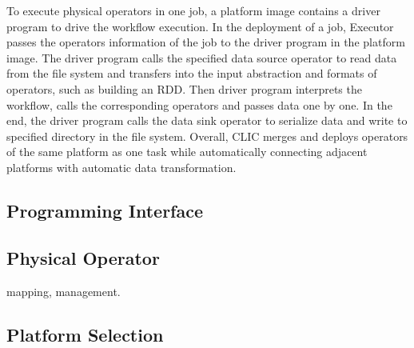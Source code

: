 To execute physical operators in one job, a platform image contains a driver program to drive the workflow execution. 
In the deployment of a job, Executor passes the operators information of the job to the driver program in the platform image. 
The driver program calls the specified data source operator to read data from the file system and transfers into the input abstraction and formats of operators, such as building an RDD. Then driver program interprets the workflow, calls the corresponding operators and passes data one by one. In the end, the driver program calls the data sink operator to serialize data and write to specified directory in the file system.
Overall, CLIC merges and deploys operators of the same platform as one task while automatically connecting adjacent platforms with automatic data transformation. 



\subsection{Programming Interface}

\subsection{Physical Operator}
mapping, management.

\subsection{Platform Selection}


